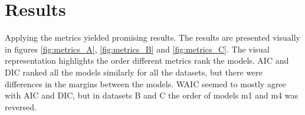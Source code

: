 \documentclass[english, 12pt, a4paper, sci, utf8, a-1b, online]{aaltothesis}
\begin{document}
\section{Results}















Applying the metrics yielded promising results. The results are presented visually in figures \ref{fig:metrics_A}, 
\ref{fig:metrics_B} and \ref{fig:metrics_C}. The visual representation highlights the order different metrics rank the models.
AIC and DIC ranked all the models similarly for all the datasets, but there were differences in the margins between the models.
WAIC seemed to mostly agree with AIC and DIC, but in datasets B and C the order of models m1 and m4 was reversed. 
\end{document}
